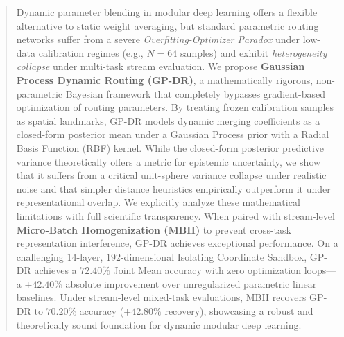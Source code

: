 \begin{abstract}
Dynamic parameter blending in modular deep learning offers a flexible alternative to static weight averaging, but standard parametric routing networks suffer from a severe \emph{Overfitting-Optimizer Paradox} under low-data calibration regimes (e.g., $N=64$ samples) and exhibit \emph{heterogeneity collapse} under multi-task stream evaluation. We propose \textbf{Gaussian Process Dynamic Routing (GP-DR)}, a mathematically rigorous, non-parametric Bayesian framework that completely bypasses gradient-based optimization of routing parameters. By treating frozen calibration samples as spatial landmarks, GP-DR models dynamic merging coefficients as a closed-form posterior mean under a Gaussian Process prior with a Radial Basis Function (RBF) kernel. While the closed-form posterior predictive variance theoretically offers a metric for epistemic uncertainty, we show that it suffers from a critical unit-sphere variance collapse under realistic noise and that simpler distance heuristics empirically outperform it under representational overlap. We explicitly analyze these mathematical limitations with full scientific transparency. When paired with stream-level \textbf{Micro-Batch Homogenization (MBH)} to prevent cross-task representation interference, GP-DR achieves exceptional performance. On a challenging $14$-layer, $192$-dimensional Isolating Coordinate Sandbox, GP-DR achieves a $72.40\%$ Joint Mean accuracy with zero optimization loops---a $+42.40\%$ absolute improvement over unregularized parametric linear baselines. Under stream-level mixed-task evaluations, MBH recovers GP-DR to $70.20\%$ accuracy ($+42.80\%$ recovery), showcasing a robust and theoretically sound foundation for dynamic modular deep learning.
\end{abstract}